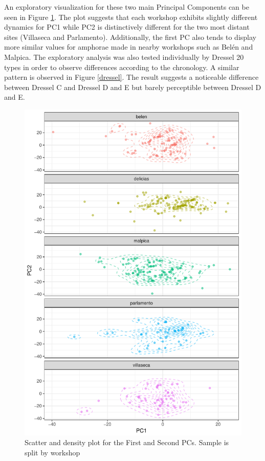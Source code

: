 \documentclass[review]{elsarticle}
\begin{document}
An exploratory visualization for these two main Principal Components can be seen in Figure \ref{pca}. The plot suggests that each workshop exhibits slightly different dynamics for PC1 while PC2 is distinctively different for the two most distant sites (Villaseca and Parlamento). Additionally, the first PC also tends to display more similar values for amphorae made in nearby workshops such as Bel\'en and Malpica. The exploratory analysis was also tested individually by Dressel 20 types in order to observe differences according to the chronology. A similar pattern is observed in Figure \ref{dressel}. The result suggests a noticeable difference between Dressel C and Dressel D and E but barely perceptible between Dressel D and E.

\begin{figure}[htp]
	\centering
\includegraphics[width=\linewidth]{figs/pca}
\caption{Scatter and density plot for the First and Second PCs. Sample is split by workshop}
\label{pca}
\end{figure} 
\end{document}

